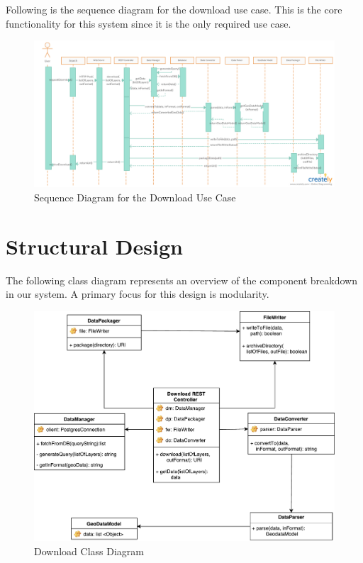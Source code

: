 \documentclass{article}
\begin{document}
Following is the sequence diagram for the download use case. This is the core functionality for this system since it is the only required use case. 

\begin{figure}[H]
	\begin{center}
		\caption{Sequence Diagram for the Download Use Case}
		\includegraphics[width=\textwidth]{images/download_sequence_diagram_v2.png}
	\end{center}
\end{figure}

\clearpage

\section{Structural Design}

The following class diagram represents an overview of the component breakdown in our system. 
A primary focus for this design is modularity.  

\begin{figure}[H]
	\begin{center}
		\caption{Download Class Diagram}
		\includegraphics[width=\textwidth]{images/class_diagram.pdf}
	\end{center}
\end{figure}
\end{document}
